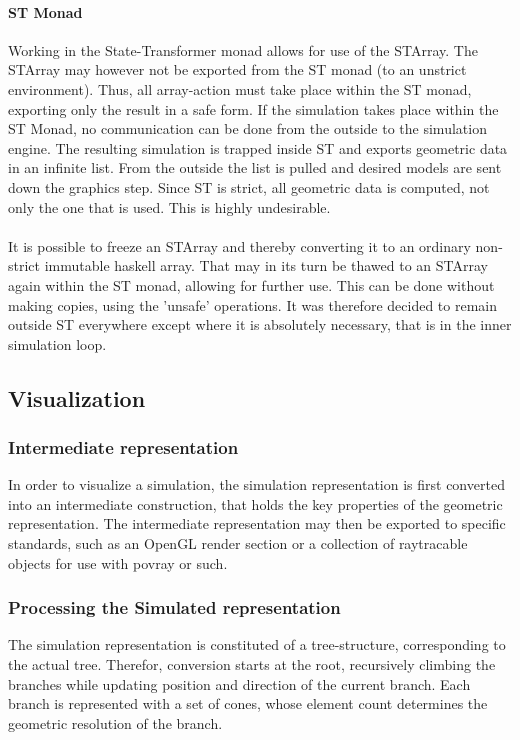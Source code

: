 \paragraph{ST Monad}
Working in the State-Transformer monad allows for use of the STArray. The STArray 
may however not be exported from the ST monad (to an unstrict environment).
Thus, all array-action must take place within the ST monad, exporting only the
result in a safe form. If the simulation takes place within the ST Monad, no
communication can be done from the outside to the simulation engine. The
resulting simulation is trapped inside ST and exports geometric data in an
infinite list. From the outside the list is pulled and desired models are sent
down the graphics step. Since ST is strict, all geometric data is computed,
not only the one that is used. This is highly undesirable.
\\\\
It is possible to freeze an STArray and thereby converting it to an ordinary
non-strict immutable haskell array. That may in its turn be thawed to an
STArray again within the ST monad, allowing for further use. This can be done
without making copies, using the 'unsafe' operations. It was therefore decided
to remain outside ST everywhere except where it is absolutely necessary, that
is in the inner simulation loop.

\subsection{Visualization}
\subsubsection{Intermediate representation}
In order to visualize a simulation, the simulation representation is first
converted into an intermediate construction, that holds the key properties of
the geometric representation. The intermediate representation may then be
exported to specific standards, such as an OpenGL render section or a collection
of raytracable objects for use with povray or such.

\subsubsection{Processing the Simulated representation}
The simulation representation is constituted of a tree-structure, corresponding
to the actual tree. Therefor, conversion starts at the root, recursively
climbing the branches while updating position and direction of the current
branch. Each branch is represented with a set of cones, whose element count
determines the geometric resolution of the branch. 

